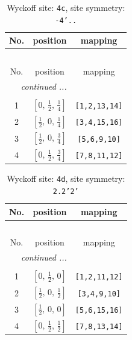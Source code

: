 \documentclass[fleqn,8pt]{jsarticle}
\begin{document}
\renewcommand{\arraystretch}{1.2}
\begin{longtable}{ccc}
\caption{Wyckoff site: {\tt 4c}, site symmetry: {\tt -4'..}}
 \\
 \hline \hline
No. & position & mapping \\ \hline \endfirsthead

\multicolumn{2}{l}{\tablename\ \thetable{}} \\
 \hline \hline
No. & position & mapping \\ \hline \endhead

 \hline \hline
\multicolumn{2}{r}{\footnotesize\it continued ...} \\ \endfoot

 \hline \hline
\multicolumn{2}{r}{} \\ \endlastfoot

1 & $\left[ 0,\, \frac{1}{2},\, \frac{1}{4} \right]$ & {\tt [1,2,13,14]} \\ \hline
2 & $\left[ \frac{1}{2},\, 0,\, \frac{1}{4} \right]$ & {\tt [3,4,15,16]} \\ \hline
3 & $\left[ \frac{1}{2},\, 0,\, \frac{3}{4} \right]$ & {\tt [5,6,9,10]} \\ \hline
4 & $\left[ 0,\, \frac{1}{2},\, \frac{3}{4} \right]$ & {\tt [7,8,11,12]} \\
\end{longtable}
\renewcommand{\arraystretch}{1.2}
\begin{longtable}{ccc}
\caption{Wyckoff site: {\tt 4d}, site symmetry: {\tt 2.2'2'}}
 \\
 \hline \hline
No. & position & mapping \\ \hline \endfirsthead

\multicolumn{2}{l}{\tablename\ \thetable{}} \\
 \hline \hline
No. & position & mapping \\ \hline \endhead

 \hline \hline
\multicolumn{2}{r}{\footnotesize\it continued ...} \\ \endfoot

 \hline \hline
\multicolumn{2}{r}{} \\ \endlastfoot

1 & $\left[ 0,\, \frac{1}{2},\, 0 \right]$ & {\tt [1,2,11,12]} \\ \hline
2 & $\left[ \frac{1}{2},\, 0,\, \frac{1}{2} \right]$ & {\tt [3,4,9,10]} \\ \hline
3 & $\left[ \frac{1}{2},\, 0,\, 0 \right]$ & {\tt [5,6,15,16]} \\ \hline
4 & $\left[ 0,\, \frac{1}{2},\, \frac{1}{2} \right]$ & {\tt [7,8,13,14]} \\
\end{longtable}
\end{document}
